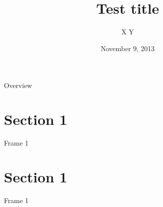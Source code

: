 \documentclass[12 pt,handout]{beamer}
\title{Test title}
\author [X.Y.] {X Y}
\date [November 2013] {November 9, 2013}
\begin{document}
	\begin{frame}
    \titlepage
	\end{frame}


	\begin{frame}{Overview}
    \tableofcontents
	\end{frame}

	\section{Section 1}
	\begin{frame}[t]{Frame 1}
	\end{frame}

	\section{Section 1}
	\begin{frame}[t]{Frame 1}
	\end{frame}

\end{document}
